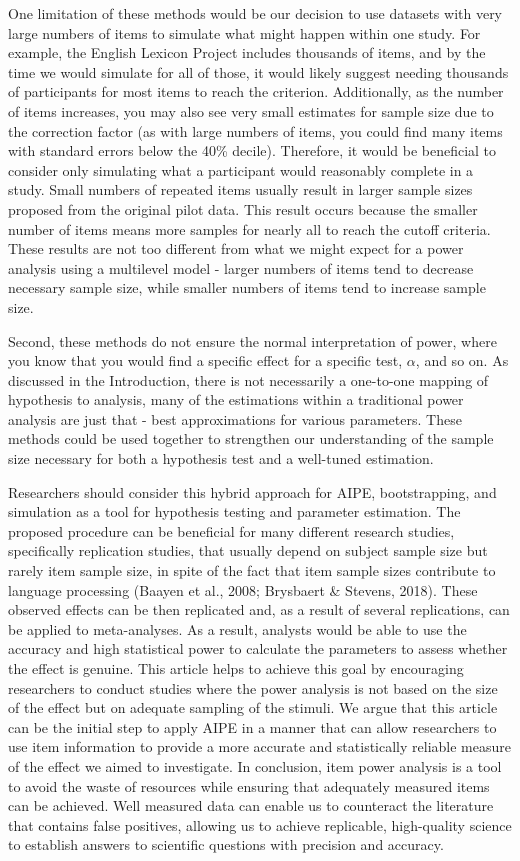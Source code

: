 \documentclass[
  man]{apa7}
\begin{document}
One limitation of these methods would be our decision to use datasets with very large numbers of items to simulate what might happen within one study. For example, the English Lexicon Project includes thousands of items, and by the time we would simulate for all of those, it would likely suggest needing thousands of participants for most items to reach the criterion. Additionally, as the number of items increases, you may also see very small estimates for sample size due to the correction factor (as with large numbers of items, you could find many items with standard errors below the 40\% decile). Therefore, it would be beneficial to consider only simulating what a participant would reasonably complete in a study. Small numbers of repeated items usually result in larger sample sizes proposed from the original pilot data. This result occurs because the smaller number of items means more samples for nearly all to reach the cutoff criteria. These results are not too different from what we might expect for a power analysis using a multilevel model - larger numbers of items tend to decrease necessary sample size, while smaller numbers of items tend to increase sample size.

Second, these methods do not ensure the normal interpretation of power, where you know that you would find a specific effect for a specific test, \(\alpha\), and so on. As discussed in the Introduction, there is not necessarily a one-to-one mapping of hypothesis to analysis, many of the estimations within a traditional power analysis are just that - best approximations for various parameters. These methods could be used together to strengthen our understanding of the sample size necessary for both a hypothesis test and a well-tuned estimation.

Researchers should consider this hybrid approach for AIPE, bootstrapping, and simulation as a tool for hypothesis testing and parameter estimation. The proposed procedure can be beneficial for many different research studies, specifically replication studies, that usually depend on subject sample size but rarely item sample size, in spite of the fact that item sample sizes contribute to language processing (Baayen et al., 2008; Brysbaert \& Stevens, 2018). These observed effects can be then replicated and, as a result of several replications, can be applied to meta-analyses. As a result, analysts would be able to use the accuracy and high statistical power to calculate the parameters to assess whether the effect is genuine. This article helps to achieve this goal by encouraging researchers to conduct studies where the power analysis is not based on the size of the effect but on adequate sampling of the stimuli. We argue that this article can be the initial step to apply AIPE in a manner that can allow researchers to use item information to provide a more accurate and statistically reliable measure of the effect we aimed to investigate. In conclusion, item power analysis is a tool to avoid the waste of resources while ensuring that adequately measured items can be achieved. Well measured data can enable us to counteract the literature that contains false positives, allowing us to achieve replicable, high-quality science to establish answers to scientific questions with precision and accuracy.
\end{document}
